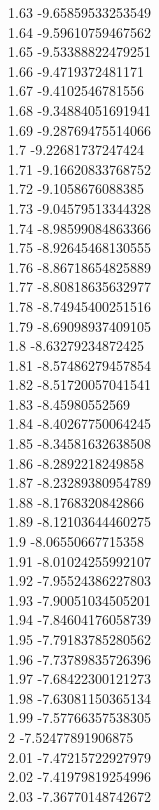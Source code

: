 {1.63	-9.65859533253549\\
1.64	-9.59610759467562\\
1.65	-9.53388822479251\\
1.66	-9.4719372481171\\
1.67	-9.4102546781556\\
1.68	-9.34884051691941\\
1.69	-9.28769475514066\\
1.7	-9.22681737247424\\
1.71	-9.16620833768752\\
1.72	-9.1058676088385\\
1.73	-9.04579513344328\\
1.74	-8.98599084863366\\
1.75	-8.92645468130555\\
1.76	-8.86718654825889\\
1.77	-8.80818635632977\\
1.78	-8.74945400251516\\
1.79	-8.69098937409105\\
1.8	-8.63279234872425\\
1.81	-8.57486279457854\\
1.82	-8.51720057041541\\
1.83	-8.45980552569\\
1.84	-8.40267750064245\\
1.85	-8.34581632638508\\
1.86	-8.2892218249858\\
1.87	-8.23289380954789\\
1.88	-8.1768320842866\\
1.89	-8.12103644460275\\
1.9	-8.06550667715358\\
1.91	-8.01024255992107\\
1.92	-7.95524386227803\\
1.93	-7.90051034505201\\
1.94	-7.84604176058739\\
1.95	-7.79183785280562\\
1.96	-7.73789835726396\\
1.97	-7.68422300121273\\
1.98	-7.63081150365134\\
1.99	-7.57766357538305\\
2	-7.52477891906875\\
2.01	-7.47215722927979\\
2.02	-7.41979819254996\\
2.03	-7.36770148742672\\
}
